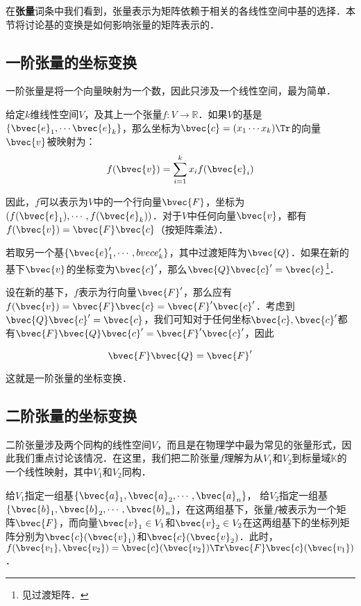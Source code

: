



在\textbf{张量}词条中我们看到，张量表示为矩阵依赖于相关的各线性空间中基的选择．本节将讨论基的变换是如何影响张量的矩阵表示的．

\subsection{一阶张量的坐标变换}
一阶张量是将一个向量映射为一个数，因此只涉及一个线性空间，最为简单．

给定$k$维线性空间$V$，及其上一个张量$f:V\rightarrow\mathbb{R}$．如果$V$的基是$\{\bvec{e}_1, \cdots\bvec{e}_k\}$，那么坐标为$\bvec{c}=(x_1\cdots x_k)\Tr$的向量$\bvec{v}$被映射为：
\begin{equation}
f(\bvec{v})=\sum\limits_{i=1}^k x_if(\bvec{e}_i)
\end{equation}

因此，$f$可以表示为$V$中的一个行向量$\bvec{F}$，坐标为$(f(\bvec{e}_1), \cdots, f(\bvec{e}_k))$．对于$V$中任何向量$\bvec{v}$，都有$f(\bvec{v})=\bvec{F}\bvec{c}$（按矩阵乘法）．

若取另一个基$\{\bvec{e}_1', \cdots, \\bvec{e}_k'\}$，其中过渡矩阵为$\bvec{Q}$．如果在新的基下$\bvec{v}$的坐标变为$\bvec{c}'$，那么$\bvec{Q}\bvec{c}'=\bvec{c}$\footnote{见过渡矩阵．}．

设在新的基下，$f$表示为行向量$\bvec{F}'$，那么应有$f(\bvec{v})=\bvec{F}\bvec{c}=\bvec{F}'\bvec{c}'$．考虑到$\bvec{Q}\bvec{c}'=\bvec{c}$，我们可知对于任何坐标$\bvec{c}, \bvec{c}'$都有$\bvec{F}\bvec{Q}\bvec{c}'=\bvec{F}'\bvec{c}'$，因此

\begin{equation}
\bvec{F}\bvec{Q}=\bvec{F}'
\end{equation}

这就是一阶张量的坐标变换．
\subsection{二阶张量的坐标变换}

二阶张量涉及两个同构的线性空间$V$，而且是在物理学中最为常见的张量形式，因此我们重点讨论该情况．在这里，我们把二阶张量$f$理解为从$V_1$和$V_2$到标量域$\mathbb{K}$的一个线性映射，其中$V_1$和$V_2$同构．

给$V_1$指定一组基$\{\bvec{a}_1, \bvec{a}_2, \cdots, \bvec{a}_n\}$， 给$V_2$指定一组基$\{\bvec{b}_1, \bvec{b}_2, \cdots, \bvec{b}_n\}$，在这两组基下，张量$f$被表示为一个矩阵$\bvec{F}$，而向量$\bvec{v}_1\in V_1$和$\bvec{v}_2\in V_2$在这两组基下的坐标列矩阵分别为$\bvec{c}(\bvec{v}_1)$和$\bvec{c}(\bvec{v}_2)$．此时，$f(\bvec{v_1},\bvec{v_2})=\bvec{c}(\bvec{v_2})\Tr\bvec{F}\bvec{c}(\bvec{v_1})$．

